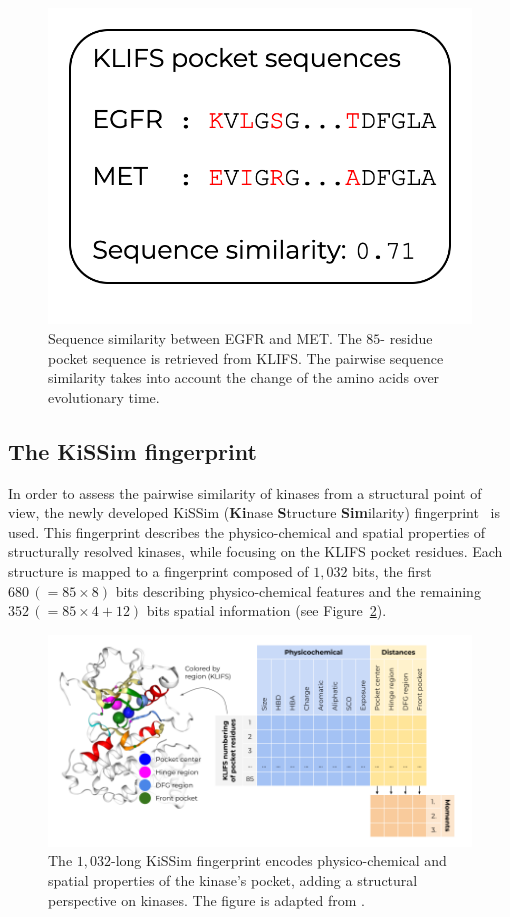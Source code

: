 \documentclass[9pt,training,ASAPversion]{livecoms}
\begin{document}
\begin{figure}[ht]
    \centering
    \includegraphics[width=0.5\columnwidth]{sequence_similarity.png}
    \caption{Sequence similarity between EGFR and MET. The $85$- residue pocket sequence is retrieved from KLIFS. The pairwise sequence similarity takes into account the change of the amino acids over evolutionary time.}
    \label{fig:pocket_sequence}
\end{figure}

\subsection{The KiSSim fingerprint}
In order to assess the pairwise similarity of kinases from a structural point of view, the newly developed KiSSim (\textbf{Ki}nase \textbf{S}tructure \textbf{Sim}ilarity) fingerprint~\cite{sydow_2022_jcim, kissim_package} is used. This fingerprint describes the physico-chemical and spatial properties of structurally resolved kinases, while focusing on the KLIFS pocket residues. Each structure is mapped to a fingerprint composed of $1,032$ bits, the first $680 \, (=85 \times 8)$ bits describing physico-chemical features and the remaining $352 \, (=85 \times 4 + 12)$ bits spatial information (see Figure~\ref{fig:kissim_similarity}).

\begin{figure}[ht]
    \centering
    \includegraphics[width=\columnwidth]{kissim_fingerprint.png}
    \caption{The $1,032$-long KiSSim fingerprint encodes physico-chemical and spatial properties of the kinase's pocket, adding a structural perspective on kinases. The figure is adapted from \cite{kissim_package}.}
    \label{fig:kissim_similarity}
\end{figure}
\end{document}

